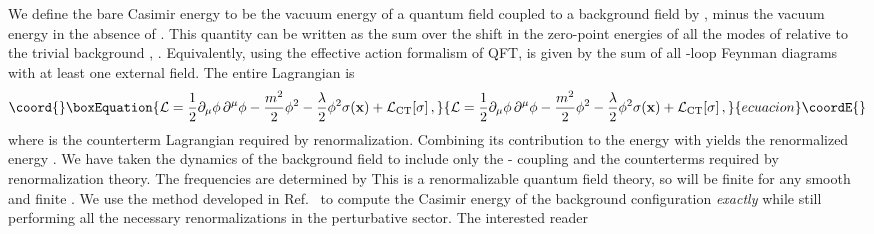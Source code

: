 \documentclass[a4paper,aps,amsfonts,prl,showpacs,nobibnotes,nofootinbib,%
tightenlines,twocolumn]{revtex4}
\providecommand{\vek}[1]{\mathbf{#1}}
\begin{document}
We define the bare Casimir energy to be the vacuum energy of a quantum
field \myHighlight{$\phi$}\coordHE{} coupled to a background field \myHighlight{$\sigma$}\coordHE{} by \coordHE{}, minus the vacuum energy in the absence of
\myHighlight{$\sigma$}\coordHE{}.  This quantity can be written as the sum over the
shift in the zero-point energies of all the modes of
\myHighlight{$\phi$}\coordHE{} relative to the trivial background
\coordHE{}, \coordHE{}. Equivalently, using the effective action formalism of
QFT, \coordHE{} is given by the sum of all \coordHE{}-loop
Feynman diagrams with at least one external \myHighlight{$\sigma$}\coordHE{} field.  The
entire Lagrangian is
%
\begin{equation}\coord{}\boxEquation{
    \mathcal{L} = \frac{1}{2} \partial_\mu\phi\,\partial^\mu\phi -
    \frac{m^2}{2} \phi^2 - \frac{\lambda}{2} \phi^2 \sigma(\vek{x}) +
    \mathcal{L}_{\rm CT}[\sigma]\,,
    \label{2.2}
}{
    \mathcal{L} = \frac{1}{2} \partial_\mu\phi\,\partial^\mu\phi -
    \frac{m^2}{2} \phi^2 - \frac{\lambda}{2} \phi^2 \sigma(\vek{x}) +
    \mathcal{L}_{\rm CT}[\sigma]\,,
    }{ecuacion}\coordE{}\end{equation}
%
where \coordHE{} is the counterterm Lagrangian
required by renormalization.  Combining its contribution to the energy
with \coordHE{} yields the renormalized energy \coordHE{}.  We have taken the dynamics of the background field
\myHighlight{$\sigma(\vek{x})$}\coordHE{} to include only the \myHighlight{$\phi$}\coordHE{}-\myHighlight{$\sigma$}\coordHE{} coupling and the
counterterms required by renormalization theory.  The frequencies
\myHighlight{$\{\omega[\sigma]\}$}\coordHE{} are determined by
\myHighlight{$-\mathbf{\nabla}^{2}\phi(\vek{x}) + (m^2 +
\lambda\sigma(\vek{x}))\phi(\vek{x}) =
\omega^{2}[\sigma]\phi(\vek{x}).$}\coordHE{} This is a renormalizable quantum
field theory, so \coordHE{} will be finite for any smooth
\myHighlight{$\sigma$}\coordHE{} and finite \myHighlight{$\lambda$}\coordHE{}.  We use the method developed in
Ref.~\cite{dens} to compute the Casimir energy of the background
configuration \emph{exactly} while still performing all the necessary
renormalizations in the perturbative sector.  The interested reader
\end{document}
